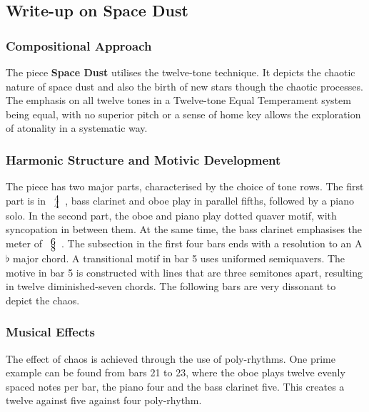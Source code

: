 \documentclass{article}
\begin{document}
\subsection{Write-up on {\bf Space Dust}}

\subsubsection{Compositional Approach}

The piece \textbf{Space Dust} utilises the twelve-tone technique. It depicts
the chaotic nature of space dust and also the birth of new stars though the
chaotic processes. The emphasis on all twelve tones in a Twelve-tone Equal
Temperament system being equal, with no superior pitch or a sense of home key
allows the exploration of atonality in a systematic way.\\

\subsubsection{Harmonic Structure and Motivic Development}

The piece has two major parts, characterised by the choice of tone rows.  The
first part is in \(\def\arraystretch{0.0}\begin{array}{c}4\\4\end{array}\),
    bass clarinet and oboe play in parallel fifths, followed by a piano solo.
In the second part, the oboe and piano play dotted quaver motif, with
syncopation in between them.  At the same time, the bass clarinet emphasises
the meter of \(\def\arraystretch{0}\begin{array}{c}6\\8\end{array}\).  The
    subsection in the first four bars ends with a resolution to an A\(\flat\)
major chord. A transitional motif in bar 5 uses uniformed semiquavers. The
motive in bar 5 is constructed with lines that are three semitones apart,
resulting in twelve diminished-seven chords.  The following bars are very
dissonant to depict the chaos.\\

\subsubsection{Musical Effects}

The effect of chaos is achieved through the use of poly-rhythms. One prime
example can be found from bars 21 to 23, where the oboe plays twelve evenly
spaced notes per bar, the piano four and the bass clarinet five. This creates a
twelve against five against four poly-rhythm.\\
\end{document}
